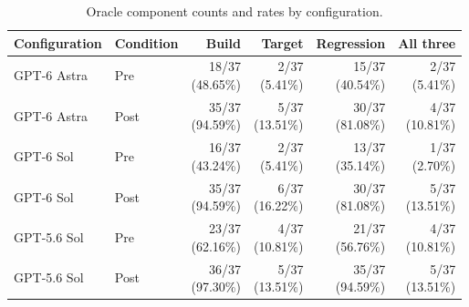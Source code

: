 \documentclass{article} %
\begin{document}
\begin{table}[htbp]
\centering\normalsize
\setlength{\tabcolsep}{3pt}
\renewcommand{\arraystretch}{1.08}
\caption{Oracle component counts and rates by configuration.}
\label{tab:oracle-component-counts}
\begin{tabularx}{\linewidth}{@{}>{\raggedright\arraybackslash}Xlrrrr@{}}
\toprule
Configuration & Condition & Build & Target & Regression & All three \\
\midrule
GPT-6 Astra & Pre & \shortstack[r]{18/37\\(48.65\%)} & \shortstack[r]{2/37\\(5.41\%)} & \shortstack[r]{15/37\\(40.54\%)} & \shortstack[r]{2/37\\(5.41\%)} \\
GPT-6 Astra & Post & \shortstack[r]{35/37\\(94.59\%)} & \shortstack[r]{5/37\\(13.51\%)} & \shortstack[r]{30/37\\(81.08\%)} & \shortstack[r]{4/37\\(10.81\%)} \\
GPT-6 Sol & Pre & \shortstack[r]{16/37\\(43.24\%)} & \shortstack[r]{2/37\\(5.41\%)} & \shortstack[r]{13/37\\(35.14\%)} & \shortstack[r]{1/37\\(2.70\%)} \\
GPT-6 Sol & Post & \shortstack[r]{35/37\\(94.59\%)} & \shortstack[r]{6/37\\(16.22\%)} & \shortstack[r]{30/37\\(81.08\%)} & \shortstack[r]{5/37\\(13.51\%)} \\
GPT-5.6 Sol & Pre & \shortstack[r]{23/37\\(62.16\%)} & \shortstack[r]{4/37\\(10.81\%)} & \shortstack[r]{21/37\\(56.76\%)} & \shortstack[r]{4/37\\(10.81\%)} \\
GPT-5.6 Sol & Post & \shortstack[r]{36/37\\(97.30\%)} & \shortstack[r]{5/37\\(13.51\%)} & \shortstack[r]{35/37\\(94.59\%)} & \shortstack[r]{5/37\\(13.51\%)} \\

\end{tabularx}
\end{table}
\end{document}
